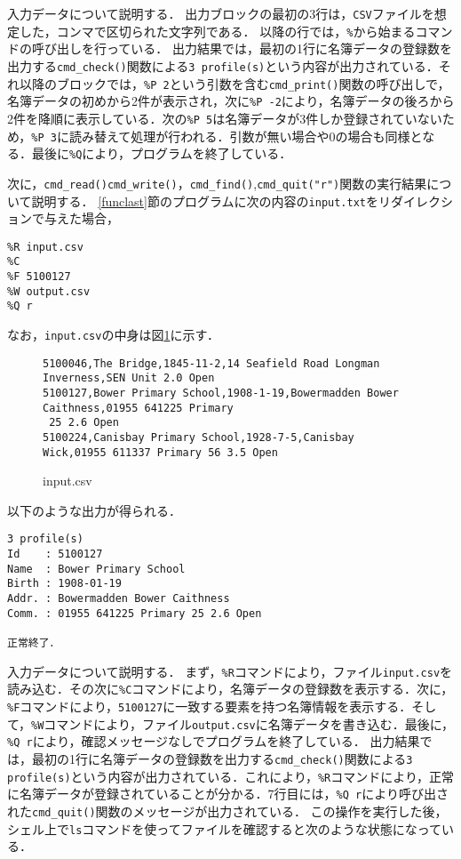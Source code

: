 入力データについて説明する．
出力ブロックの最初の3行は，\verb|CSV|ファイルを想定した，コンマで区切られた文字列である．
以降の行では，\verb|%|から始まるコマンドの呼び出しを行っている．
出力結果では，最初の1行に名簿データの登録数を出力する\verb|cmd_check()|関数による\verb|3 profile(s)|という内容が出力されている．それ以降のブロックでは，\verb|%P 2|という引数を含む\verb|cmd_print()|関数の呼び出しで，名簿データの初めから2件が表示され，次に\verb|%P -2|により，名簿データの後ろから2件を降順に表示している．次の\verb|%P 5|は名簿データが3件しか登録されていないため，\verb|%P 3|に読み替えて処理が行われる．引数が無い場合や$0$の場合も同様となる．最後に\verb|%Q|により，プログラムを終了している．

次に，\verb|cmd_read()|\verb|cmd_write()|，\verb|cmd_find()|,\verb|cmd_quit("r")|関数の実行結果について説明する．
\ref{funclast}節のプログラムに次の内容の\verb|input.txt|をリダイレクションで与えた場合，

{\fontsize{10pt}{11pt} \selectfont
 \begin{verbatim}
%R input.csv
%C
%F 5100127
%W output.csv
%Q r
 \end{verbatim}
}

\noindent
なお，\verb|input.csv|の中身は図\ref{input.csv}に示す．
\begin{figure}[b]
{\fontsize{10pt}{11pt} \selectfont
 \begin{verbatim}
5100046,The Bridge,1845-11-2,14 Seafield Road Longman Inverness,SEN Unit 2.0 Open
5100127,Bower Primary School,1908-1-19,Bowermadden Bower Caithness,01955 641225 Primary
 25 2.6 Open
5100224,Canisbay Primary School,1928-7-5,Canisbay Wick,01955 611337 Primary 56 3.5 Open
 \end{verbatim}
}
\caption{input.csv}
\label{input.csv}
\end{figure}

\noindent %
以下のような出力が得られる．

{\fontsize{10pt}{11pt} \selectfont
 \begin{verbatim}
3 profile(s)
Id    : 5100127
Name  : Bower Primary School
Birth : 1908-01-19
Addr. : Bowermadden Bower Caithness
Comm. : 01955 641225 Primary 25 2.6 Open

正常終了．
 \end{verbatim}
}

入力データについて説明する．
まず，\verb|%R|コマンドにより，ファイル\verb|input.csv|を読み込む．その次に\verb|%C|コマンドにより，名簿データの登録数を表示する．次に，\verb|%F|コマンドにより，\verb|5100127|に一致する要素を持つ名簿情報を表示する．そして，\verb|%W|コマンドにより，ファイル\verb|output.csv|に名簿データを書き込む．最後に，\verb|%Q r|により，確認メッセージなしでプログラムを終了している．
出力結果では，最初の1行に名簿データの登録数を出力する\verb|cmd_check()|関数による\verb|3 profile(s)|という内容が出力されている．これにより，\verb|%R|コマンドにより，正常に名簿データが登録されていることが分かる．7行目には，\verb|%Q r|により呼び出された\verb|cmd_quit()|関数のメッセージが出力されている．
この操作を実行した後，シェル上で\verb|ls|コマンドを使ってファイルを確認すると次のような状態になっている．

